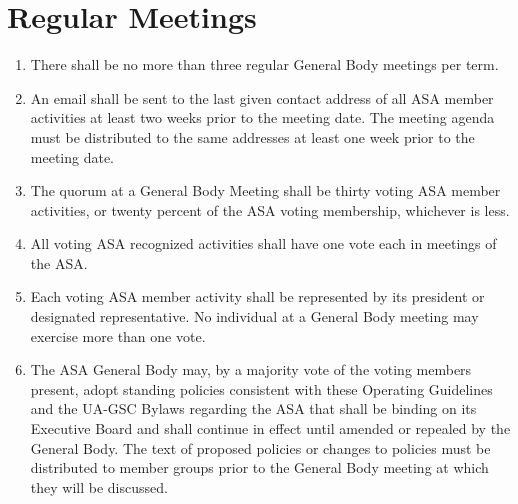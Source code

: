 \documentclass[12pt]{article}
\begin{document}
\section{Regular Meetings}
\begin{enumerate}
    \item There shall be no more than three regular General Body meetings per term.
    
    \item An email shall be sent to the last given contact address of all ASA member activities at
        least two weeks prior to the meeting date.
    The meeting agenda must be distributed to the same addresses at least one week prior to the meeting date.

    \item The quorum at a General Body Meeting shall be thirty voting ASA member activities, or
        twenty percent of the ASA voting membership, whichever is less.
    
    \item All voting ASA recognized activities shall have one vote each in meetings of the ASA.

    \item Each voting ASA member activity shall be represented by its president or designated
        representative.
    No individual at a General Body meeting may exercise more than one vote.

    \item The ASA General Body may, by a majority vote of the voting members present, adopt
        standing policies consistent with these Operating Guidelines and the UA-GSC Bylaws
        regarding the ASA that shall be binding on its Executive Board and shall continue in effect
        until amended or repealed by the General Body.
    The text of proposed policies or changes to policies must be distributed to member groups prior
        to the General Body meeting at which they will be discussed.
\end{enumerate}
\end{document}
